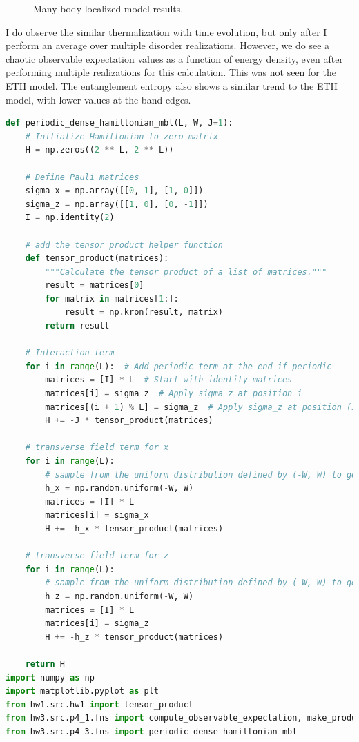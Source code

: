 \documentclass[12pt]{article}
\begin{document}
\begin{figure}[htbp]
    \caption{Many-body localized model results.}
\end{figure}
I do observe the similar thermalization with time evolution, but only after I perform an average over multiple disorder realizations. However, we do see a chaotic observable expectation values as a function of energy density, even after performing multiple realizations for this calculation. This was not seen for the ETH model. The entanglement entropy also shows a similar trend to the ETH model, with lower values at the band edges.
\begin{lstlisting}[language=Python]
def periodic_dense_hamiltonian_mbl(L, W, J=1):
    # Initialize Hamiltonian to zero matrix
    H = np.zeros((2 ** L, 2 ** L))

    # Define Pauli matrices
    sigma_x = np.array([[0, 1], [1, 0]])
    sigma_z = np.array([[1, 0], [0, -1]])
    I = np.identity(2)

    # add the tensor product helper function
    def tensor_product(matrices):
        """Calculate the tensor product of a list of matrices."""
        result = matrices[0]
        for matrix in matrices[1:]:
            result = np.kron(result, matrix)
        return result
    
    # Interaction term
    for i in range(L):  # Add periodic term at the end if periodic
        matrices = [I] * L  # Start with identity matrices
        matrices[i] = sigma_z  # Apply sigma_z at position i
        matrices[(i + 1) % L] = sigma_z  # Apply sigma_z at position (i+1) modulo L for periodic
        H += -J * tensor_product(matrices)

    # transverse field term for x
    for i in range(L):
        # sample from the uniform distribution defined by (-W, W) to get an h_x value
        h_x = np.random.uniform(-W, W)
        matrices = [I] * L
        matrices[i] = sigma_x
        H += -h_x * tensor_product(matrices)

    # transverse field term for z
    for i in range(L):
        # sample from the uniform distribution defined by (-W, W) to get an h_z value
        h_z = np.random.uniform(-W, W)
        matrices = [I] * L
        matrices[i] = sigma_z
        H += -h_z * tensor_product(matrices)

    return H
import numpy as np
import matplotlib.pyplot as plt
from hw1.src.hw1 import tensor_product
from hw3.src.p4_1.fns import compute_observable_expectation, make_product_state, compute_thermal_energy, compute_thermal_observable
from hw3.src.p4_3.fns import periodic_dense_hamiltonian_mbl


\end{lstlisting}
\end{document}
